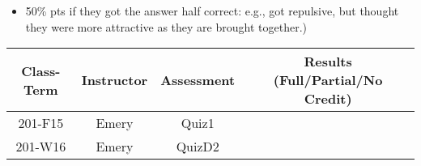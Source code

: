 \begin{rubric}

\begin{itemize}
	\item 50\% pts if they got the answer half correct: e.g., got repulsive, but thought they were more attractive as they are brought together.) 
\end{itemize}

\end{rubric}

\begin{outcomes}
	\begin{center}
		\begin{tabular}{cccc}
			\hline\hline
                Class-Term & Instructor & Assessment & Results (Full/Partial/No Credit) \\
			\hline
                201-F15 & Emery & Quiz1 &  \\
                201-W16 & Emery & QuizD2 &  \\
			\hline
		\end{tabular}
	\end{center}
\end{outcomes}

\begin{comments}
	
\end{comments}

